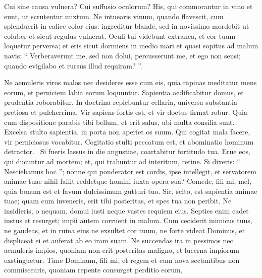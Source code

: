 \begin{biblechapter}
\begin{biblechapter}
\begin{biblechapter}
\begin{biblechapter}
\begin{biblechapter}
\begin{biblechapter}
\begin{biblechapter}
\begin{biblechapter}
\begin{biblechapter}
\begin{biblechapter}
\begin{biblechapter}
\begin{biblechapter}
\begin{biblechapter}
\begin{biblechapter}
\begin{biblechapter}
\begin{biblechapter}
\begin{biblechapter}
\begin{biblechapter}
\begin{biblechapter}
\begin{biblechapter}
\begin{biblechapter}
\begin{biblechapter}
\begin{biblechapter}
 Cui sine causa vulnera? Cui suffusio oculorum?
 \verse His, qui commorantur in vino
 et eunt, ut scrutentur mixtum.
 \verse Ne intuearis vinum, quando flavescit,
 cum splenduerit in calice color eius:
 ingreditur blande,
 \verse sed in novissimo mordebit ut coluber
 et sicut regulus vulnerat.
 \verse Oculi tui videbunt extranea,
 et cor tuum loquetur perversa;
 \verse et eris sicut dormiens in medio mari
 et quasi sopitus ad malum navis:
 \verse “ Verberaverunt me, sed non dolui,
 percusserunt me, et ego non sensi;
 quando evigilabo et rursus illud requiram? ”.
 
\begin{biblechapter}
 \verse Ne aemuleris viros malos
 nec desideres esse cum eis,
 \verse quia rapinas meditatur mens eorum,
 et perniciem labia eorum loquuntur.
 \verse Sapientia aedificabitur domus,
 et prudentia roborabitur.
 \verse In doctrina replebuntur cellaria,
 universa substantia pretiosa et pulcherrima.
 \verse Vir sapiens fortis est,
 et vir doctus firmat robur.
 \verse Quia cum dispositione parabis tibi bellum,
 et erit salus, ubi multa consilia sunt.
 \verse Excelsa stulto sapientia,
 in porta non aperiet os suum.
 \verse Qui cogitat mala facere,
 vir perniciosus vocabitur.
 \verse Cogitatio stulti peccatum est,
 et abominatio hominum detractor. 
 \verse Si fueris lassus in die angustiae,
 coartabitur fortitudo tua.
 \verse Erue eos, qui ducuntur ad mortem;
 et, qui trahuntur ad interitum, retine.
 \verse Si dixeris: “ Nesciebamus hoc ”;
 nonne qui ponderator est cordis, ipse intellegit,
 et servatorem animae tuae nihil fallit
 reddetque homini iuxta opera sua?
 \verse Comede, fili mi, mel, quia bonum est
 et favum dulcissimum gutturi tuo.
 \verse Sic, scito, est sapientia animae tuae;
 quam cum inveneris, erit tibi posteritas,
 et spes tua non peribit.
 \verse Ne insidieris, o nequam, domui iusti
 neque vastes requiem eius.
 \verse Septies enim cadet iustus et resurget;
 impii autem corruent in malum.
 \verse Cum ceciderit inimicus tuus, ne gaudeas,
 et in ruina eius ne exsultet cor tuum,
 \verse ne forte videat Dominus, et displiceat ei
 et auferat ab eo iram suam.
 \verse Ne succendas ira in pessimos
 nec aemuleris impios,
 \verse quoniam non erit posteritas maligno,
 et lucerna impiorum exstinguetur.
 \verse Time Dominum, fili mi, et regem
 et cum nova sectantibus non commiscearis,
 \verse quoniam repente consurget perditio eorum,

\end{biblechapter}
\end{biblechapter}
\end{biblechapter}
\end{biblechapter}
\end{biblechapter}
\end{biblechapter}
\end{biblechapter}
\end{biblechapter}
\end{biblechapter}
\end{biblechapter}
\end{biblechapter}
\end{biblechapter}
\end{biblechapter}
\end{biblechapter}
\end{biblechapter}
\end{biblechapter}
\end{biblechapter}
\end{biblechapter}
\end{biblechapter}
\end{biblechapter}
\end{biblechapter}
\end{biblechapter}
\end{biblechapter}
\end{biblechapter}
